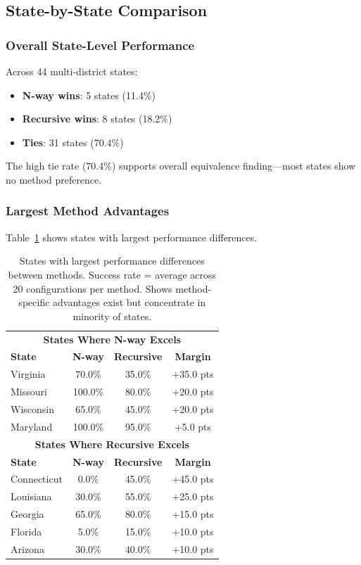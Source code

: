 \subsection{State-by-State Comparison}

\subsubsection{Overall State-Level Performance}

Across 44 multi-district states:
\begin{itemize}
\item \textbf{N-way wins}: 5 states (11.4\%)
\item \textbf{Recursive wins}: 8 states (18.2\%)
\item \textbf{Ties}: 31 states (70.4\%)
\end{itemize}

The high tie rate (70.4\%) supports overall equivalence finding—most states show no method preference.

\subsubsection{Largest Method Advantages}

Table~\ref{tab:state_advantages} shows states with largest performance differences.

\begin{table}[h]
\centering
\begin{tabular}{lccc}
\toprule
\multicolumn{4}{c}{\textbf{States Where N-way Excels}} \\
\textbf{State} & \textbf{N-way} & \textbf{Recursive} & \textbf{Margin} \\
\midrule
Virginia       & 70.0\% & 35.0\% & +35.0 pts \\
Missouri       & 100.0\% & 80.0\% & +20.0 pts \\
Wisconsin      & 65.0\% & 45.0\% & +20.0 pts \\
Maryland       & 100.0\% & 95.0\% & +5.0 pts \\
\midrule
\multicolumn{4}{c}{\textbf{States Where Recursive Excels}} \\
\textbf{State} & \textbf{N-way} & \textbf{Recursive} & \textbf{Margin} \\
\midrule
Connecticut    & 0.0\% & 45.0\% & +45.0 pts \\
Louisiana      & 30.0\% & 55.0\% & +25.0 pts \\
Georgia        & 65.0\% & 80.0\% & +15.0 pts \\
Florida        & 5.0\% & 15.0\% & +10.0 pts \\
Arizona        & 30.0\% & 40.0\% & +10.0 pts \\
\bottomrule
\end{tabular}
\caption{States with largest performance differences between methods. Success rate = average across 20 configurations per method. Shows method-specific advantages exist but concentrate in minority of states.}
\label{tab:state_advantages}
\end{table}

